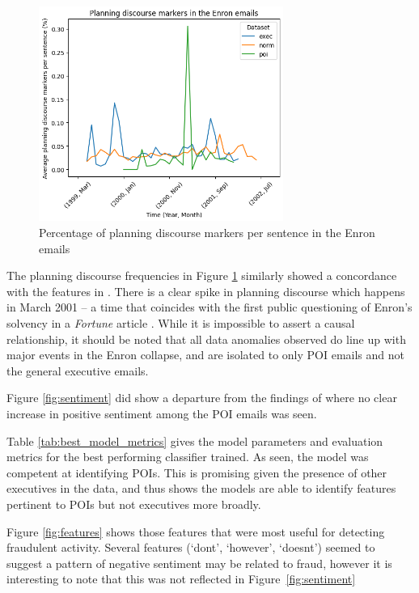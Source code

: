 \begin{figure}[b!]
    \centering
    \includegraphics[width=8cm]{images/discourse_plot.png}
    \caption{Percentage of planning discourse markers per sentence in the Enron emails}
    \label{fig:discourse}
\end{figure}

The planning discourse frequencies in Figure \ref{fig:discourse} similarly showed a concordance with the features in \cite{diplomacy}. There is a clear spike in planning discourse which happens in March 2001 -- a time that coincides with the first public questioning of Enron's solvency in a \textit{Fortune} article \cite{fortune}. While it is impossible to assert a causal relationship, it should be noted that all data anomalies observed do line up with major events in the Enron collapse, and are isolated to only POI emails and not the general executive emails. %

Figure \ref{fig:sentiment} did show a departure from the findings of \cite{diplomacy} where no clear increase in positive sentiment among the POI emails was seen. %

Table \ref{tab:best_model_metrics} gives the model parameters and evaluation metrics for the best performing classifier trained. As seen, the model was competent at identifying POIs. This is promising given the presence of other executives in the data, and thus shows the models are able to identify features pertinent to POIs but not executives more broadly.

Figure \ref{fig:features} shows those features that were most useful for detecting fraudulent activity. %
Several features (`dont', `however', `doesnt') seemed to suggest a pattern of negative sentiment may be related to fraud, however it is interesting to note that this was not reflected in Figure~\ref{fig:sentiment}%

